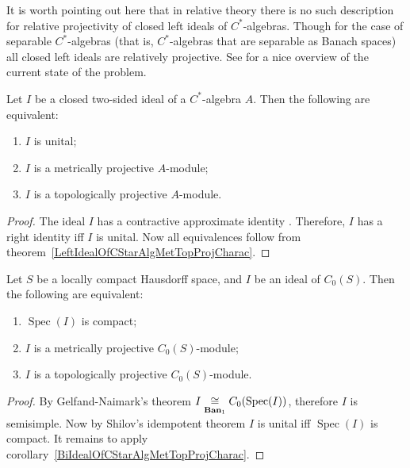 It is worth pointing out here that in relative theory there is no such description
for relative projectivity of closed left ideals of $C^*$-algebras. Though for the case
of separable $C^*$-algebras (that is, $C^*$-algebras that are separable as Banach
spaces) all closed left ideals are relatively projective. See
\cite[section 6]{LykProjOfBanAndCStarAlgsOfContFld} for a nice overview of the
current state of the problem.

\begin{corollary}\label{BiIdealOfCStarAlgMetTopProjCharac} Let $I$ be a closed
two-sided ideal of a $C^*$-algebra $A$. Then the following are equivalent:

\begin{enumerate}[label = (\roman*)]
    \item $I$ is unital;

    \item $I$ is a metrically projective $A$-module;

    \item $I$ is a topologically projective $A$-module.
\end{enumerate}
\end{corollary}
\begin{proof} The ideal $I$ has a contractive approximate identity
\cite[theorem 4.7.79]{HelBanLocConvAlg}. Therefore, $I$ has a right identity
iff $I$ is unital. Now all equivalences follow from
theorem~\ref{LeftIdealOfCStarAlgMetTopProjCharac}. 
\end{proof}

\begin{corollary}\label{IdealofCommCStarAlgMetTopProjCharac} Let $S$ be a
locally compact Hausdorff space, and $I$ be an ideal of $C_0(S)$. Then the
following are equivalent:

\begin{enumerate}[label = (\roman*)]
    \item $\operatorname{Spec}(I)$ is compact;

    \item $I$ is a metrically projective $C_0(S)$-module;

    \item $I$ is a topologically projective $C_0(S)$-module.
\end{enumerate}
\end{corollary}
\begin{proof} By Gelfand-Naimark's theorem
$I\mathrel{\mathop{\cong}\limits_{\mathbf{Ban}_1}}C_0(\operatorname{Spec}(I))$, therefore $I$ is
semisimple. Now by Shilov's idempotent theorem $I$ is unital iff
$\operatorname{Spec}(I)$ is compact. It remains to apply
corollary~\ref{BiIdealOfCStarAlgMetTopProjCharac}. 
\end{proof}

